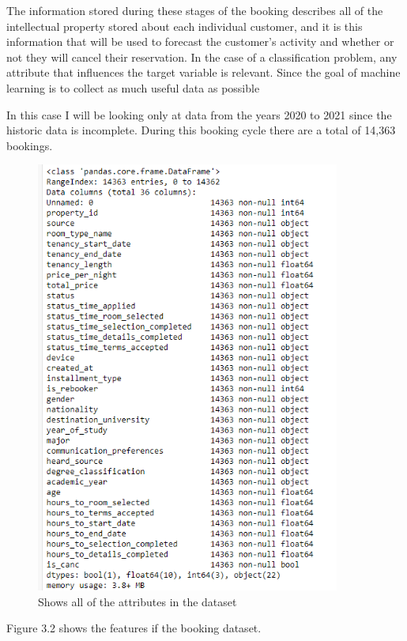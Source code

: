 \vspace{5mm}

The information stored during these stages of the booking describes all of the intellectual property stored about each individual customer, and it is this information that will be used to forecast the customer's activity and whether or not they will cancel their reservation. In the case of a classification problem, any attribute that influences the target variable is relevant. Since the goal of machine learning is to collect as much useful data as possible

In this case I will be looking only at data from the years 2020 to 2021 since the historic data is incomplete. During this booking cycle there are a total of 14,363 bookings.

\begin{figure}[hbt!]
 \includegraphics[width=10cm]{figures/df_info.png}
 \caption{Shows all of the attributes in the dataset}
\end{figure}

Figure 3.2 shows the features if the booking dataset. 

